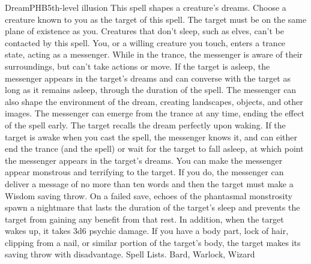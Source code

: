 \begin{spell}{Dream}{PHB}{5th-level illusion}
{
}
This spell shapes a creature’s dreams. Choose a creature known to you as the target of this spell. The target must be on the same plane of existence as you. Creatures that don’t sleep, such as elves, can’t be contacted by this spell. You, or a willing creature you touch, enters a trance state, acting as a messenger. While in the trance, the messenger is aware of their surroundings, but can’t take actions or move.
If the target is asleep, the messenger appears in the target’s dreams and can converse with the target as long as it remains asleep, through the duration of the spell. The messenger can also shape the environment of the dream, creating landscapes, objects, and other images. The messenger can emerge from the trance at any time, ending the effect of the spell early. The target recalls the dream perfectly upon waking. If the target is awake when you cast the spell, the messenger knows it, and can either end the trance (and the spell) or wait for the target to fall asleep, at which point the messenger appears in the target’s dreams.
You can make the messenger appear monstrous and terrifying to the target. If you do, the messenger can deliver a message of no more than ten words and then the target must make a Wisdom saving throw. On a failed save, echoes of the phantasmal monstrosity spawn a nightmare that lasts the duration of the target’s sleep and prevents the target from gaining any benefit from that rest. In addition, when the target wakes up, it takes 3d6 psychic damage.
If you have a body part, lock of hair, clipping from a nail, or similar portion of the target’s body, the target makes its saving throw with disadvantage.
Spell Lists. Bard, Warlock, Wizard
\end{spell}

